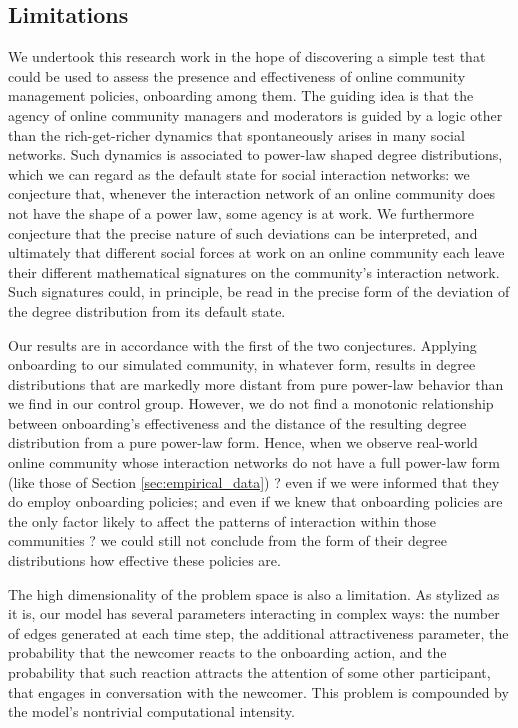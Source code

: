 \documentclass{nws}
\begin{document}
\subsection{Limitations}

We undertook this research work in the hope of discovering a simple test that could be used to assess the presence and effectiveness of online community management policies, onboarding among them. The guiding idea is that the agency of online community managers and moderators is guided by a logic other than the rich-get-richer dynamics that spontaneously arises in many social networks. Such dynamics is associated to power-law shaped degree distributions, which we can regard as the default state for social interaction networks: we conjecture that, whenever the interaction network of an online community does not have the shape of a power law, some agency is at work. We furthermore conjecture that the precise nature of such deviations can be interpreted, and ultimately that different social forces at work on an online community each leave their different mathematical signatures on the community's interaction network. Such signatures could, in principle, be read in the precise form of the deviation of the degree distribution from its default state. 

Our results are in accordance with the first of the two conjectures. Applying onboarding to our simulated community, in whatever form, results in degree distributions that are markedly more distant from pure power-law behavior than we find in our control group. However, we do not find a monotonic relationship between onboarding's effectiveness and the distance of the resulting degree distribution from a pure power-law form. Hence, when we observe real-world online community whose interaction networks do not have a full power-law form (like those of Section \ref{sec:empirical_data}) ? even if we were informed that they do employ onboarding policies; and even if we knew that onboarding policies are the only factor likely to affect the patterns of interaction within those communities ? we could still not conclude from the form of their degree distributions how effective these policies are. 

The high dimensionality of the problem space is also a limitation. As stylized as it is, our model has several parameters interacting in complex ways: the number of edges generated at each time step, the additional attractiveness parameter, the probability that the newcomer reacts to the onboarding action, and the probability that such reaction attracts the attention of some other participant, that engages in conversation with the newcomer. This problem is compounded by the model's nontrivial computational intensity. 
\end{document}
